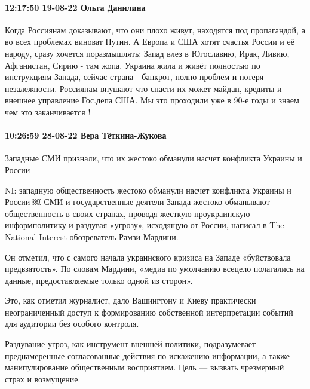 \paragraph{12:17:50 19-08-22 Ольга Данилина}

Когда Россиянам доказывают, что они плохо живут, находятся под пропагандой, а
во всех проблемах виноват Путин. А Европа и США хотят счастья России и её
народу, сразу хочется поразмышлять: Запад влез в Югославию, Ирак, Ливию,
Афганистан, Сирию - там жопа. Украина жила и живёт полностью по инструкциям
Запада, сейчас страна - банкрот, полно проблем и потеря незалежности. Россиянам
внушают что спасти их может майдан, кредиты и внешнее управление Гос.депа США.
Мы это проходили уже в 90-е годы и знаем чем это заканчивается !

\paragraph{10:26:59 28-08-22 Вера Тёткина-Жукова}

Западные СМИ признали, что их жестоко обманули насчет конфликта Украины и
России

NI: западную общественность жестоко обманули насчет конфликта Украины и России
￼ СМИ и государственные деятели Запада жестоко обманывают общественность в
своих странах, проводя жесткую проукраинскую информполитику и раздувая
«угрозу», исходящую от России, написал в The National Interest обозреватель
Рамзи Мардини.

Он отметил, что с самого начала украинского кризиса на Западе «буйствовала
предвзятость». По словам Мардини, «медиа по умолчанию всецело полагались на
данные, предоставляемые только одной из сторон».

Это, как отметил журналист, дало Вашингтону и Киеву практически неограниченный
доступ к формированию собственной интерпретации событий для аудитории без
особого контроля.

Раздувание угроз, как инструмент внешней политики, подразумевает преднамеренные
согласованные действия по искажению информации, а также манипулирование
общественным восприятием. Цель — вызвать чрезмерный страх и возмущение.

